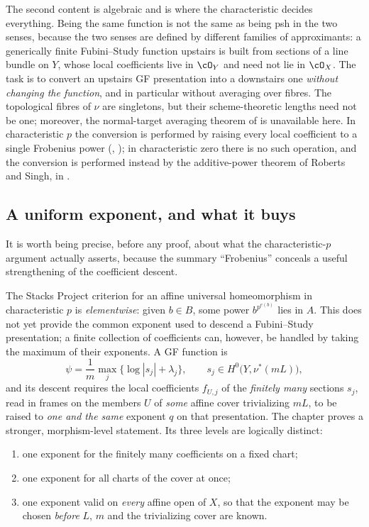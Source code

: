 The second content is algebraic and is where the characteristic decides
everything.  Being the same function is not the same as being psh in the two
senses, because the two senses are defined by different families of
approximants: a generically finite Fubini--Study function upstairs is built
from sections of a line bundle on $Y$, whose local coefficients live in
$\cO_Y$ and need not lie in $\cO_X$.  The task is to convert an upstairs
GF presentation into a downstairs one \emph{without changing the function},
and in particular without averaging over fibres.  The topological fibres of
$\nu$ are singletons, but their scheme-theoretic lengths need not be one;
moreover, the normal-target averaging theorem of
 is unavailable here.  In characteristic $p$
the conversion is performed by
raising every local coefficient to a single Frobenius power
(, ); in
characteristic zero there is no such operation, and the conversion is
performed instead by the additive-power theorem of Roberts and Singh, in
.

\subsection{A uniform exponent, and what it buys}
\label{sec:ch43-uniformity}

It is worth being precise, before any proof, about what the
characteristic-$p$ argument actually asserts, because the summary
``Frobenius'' conceals a useful strengthening of the coefficient descent.

The Stacks Project criterion for an affine universal homeomorphism in
characteristic $p$ is \emph{elementwise}: given $b\in B$, some power
$b^{p^{e(b)}}$ lies in $A$.  This does not yet provide the common exponent used to descend a
Fubini--Study presentation; a finite collection of coefficients can,
however, be handled by taking the maximum of their exponents.  A GF function is
\[
 \psi=\frac1m\max_j\{\log|s_j|+\lambda_j\},
 \qquad
 s_j\in H^0\bigl(Y,\nu^*(mL)\bigr),
\]
and its descent requires the local coefficients $f_{U,j}$ of the
\emph{finitely many} sections $s_j$, read in frames on the members
$U$ of \emph{some} affine cover trivializing $mL$, to be raised to
\emph{one and the same} exponent $q$ on that presentation.  The chapter
proves a stronger, morphism-level statement.  Its three levels are
logically distinct:

\begin{enumerate}
\item\label{itm:ch43-unif:sections}
      one exponent for the finitely many coefficients on a fixed chart;
\item\label{itm:ch43-unif:charts}
      one exponent for all charts of the cover at once;
\item\label{itm:ch43-unif:covers}
      one exponent valid on \emph{every} affine open of $X$, so that the
      exponent may be chosen \emph{before} $L$, $m$ and the trivializing
      cover are known.
\end{enumerate}

